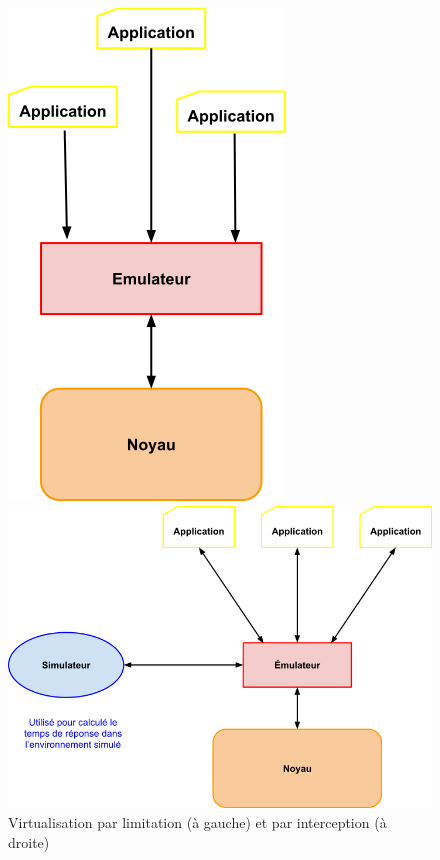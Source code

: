 \begin{figure}[H]
  \centering
  \begin{minipage}[b]{.46\linewidth}
    \centering
    \includegraphics[scale=0.25]{Pictures/png/Virtualisation_limitation}
  \end{minipage} \hfill
  \begin{minipage}[b]{.46\linewidth}
    \centering
    \includegraphics[scale=0.25]{Pictures/png/Virtualisation_interception}
  \end{minipage} 
  \caption{Virtualisation par limitation (à gauche) et par interception (à droite)}
  \label{TYPE_VIRTUALISATION}
\end{figure}

